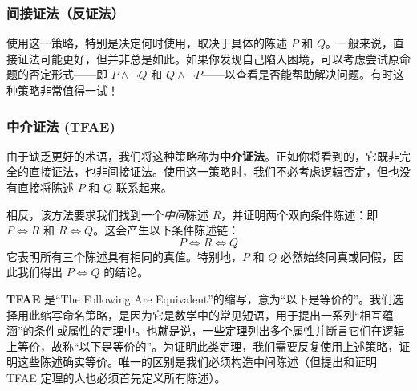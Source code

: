 \subsubsection*{间接证法（反证法）}

\begin{center}
    \noindent {}
\end{center}

使用这一策略，特别是决定何时使用，取决于具体的陈述 $P$ 和 $Q$。一般来说，直接证法可能更好，但并非总是如此。如果你发现自己陷入困境，可以考虑尝试原命题的否定形式——即 $P \land \neg Q$ 和 $Q \land \neg P$——以查看是否能帮助解决问题。有时这种策略非常值得一试！

\subsubsection*{中介证法 (TFAE)}

由于缺乏更好的术语，我们将这种策略称为\textbf{中介证法}。正如你将看到的，它既非完全的直接证法，也非间接证法。使用这一策略时，我们不必考虑逻辑否定，但也没有直接将陈述 $P$ 和 $Q$ 联系起来。

相反，该方法要求我们找到一个\emph{中间}陈述 $R$，并证明两个双向条件陈述：即 $P \iff R$ 和 $R \iff Q$。这会产生以下条件陈述链：
\[P \iff R \iff Q\]
它表明所有三个陈述具有相同的真值。特别地，$P$ 和 $Q$ 必然始终同真或同假，因此我们得出 $P \iff Q$ 的结论。

\textbf{TFAE} 是``The Following Are Equivalent''的缩写，意为``以下是等价的''。我们选择用此缩写命名策略，是因为它是数学中的常见短语，用于提出一系列``相互蕴涵''的条件或属性的定理中。也就是说，一些定理列出多个属性并断言它们在逻辑上等价，故称``以下是等价的''。为证明此类定理，我们需要反复使用上述策略，证明这些陈述确实等价。唯一的区别是我们必须构造中间陈述（但提出和证明 TFAE 定理的人也必须首先定义所有陈述）。

